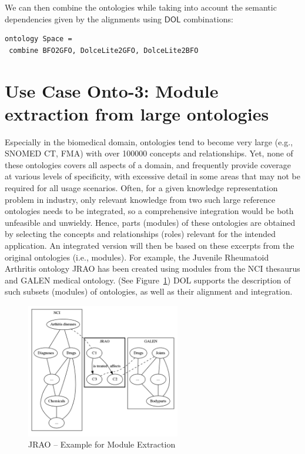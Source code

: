 \documentclass[10pt,fleqn,%
\ifpretendfinal
final%
\else
draft%
\fi,
]{scrreprt}
\newcommand*{\DOL}{\ensuremath{\mathsf{DOL}}\xspace}
\newcommand{\figurerefname}{Figure}
\newcommand{\fref}[1]{\figurerefname~\ref{#1}}
\begin{document}
We can then combine the ontologies while taking into account the semantic dependencies given by the alignments using
\DOL combinations:

\begin{lstlisting}[basicstyle=\ttfamily\footnotesize,language=dolText,morekeywords={props,ObjectProperty,Class,DisjointUnionOf,SubClassOf,Characteristics,Transitive,Asymmetric,SubPropertyOf,DisjointClasses,EquivalentTo,inverse,only,forall,iff,if,or,exists,bridge,distributed,from},escapechar=@,mathescape]
ontology Space =
 combine BFO2GFO, DolceLite2GFO, DolceLite2BFO
\end{lstlisting} 

\section{Use Case Onto-3: Module extraction from large ontologies}
Especially in the biomedical domain, ontologies tend to become very large (e.g., SNOMED CT, FMA) 
with over 100000 concepts and relationships. Yet, none of these ontologies covers all aspects of a 
domain, and frequently provide coverage at various levels of specificity, with excessive detail in 
some areas that may not be required for all usage scenarios. Often, for a given knowledge 
representation problem in industry, only relevant knowledge from two such large reference 
ontologies needs to be integrated, so a comprehensive integration would be both unfeasible and 
unwieldy. Hence, parts (modules) of these ontologies are obtained by selecting the concepts and 
relationships (roles) relevant for the intended application. An integrated version will then be 
based on these excerpts from the original ontologies (i.e., modules). For example, the Juvenile 
Rheumatoid Arthritis ontology JRAO has been created using modules from the NCI thesaurus and GALEN 
medical ontology. (See \fref{JRAO}) DOL  
supports the description of such subsets (modules) of ontologies, as well as their alignment and 
integration.


\begin{figure}[htbp]
\begin{center}
\includegraphics[width=0.6\textwidth]{useCaseOnto3.png}
\caption{JRAO  -- Example for Module Extraction}
\label{JRAO}
\end{center}
\end{figure}
\end{document}
